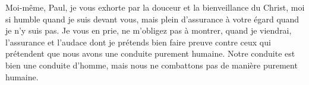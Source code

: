 Moi-même, Paul, je vous exhorte par la douceur et la bienveillance du Christ,
	moi si humble quand je suis devant vous,
	mais plein d’assurance à votre égard quand je n’y suis pas.
Je vous en prie, ne m’obligez pas à montrer, quand je viendrai,
	l’assurance et l’audace dont je prétends bien faire preuve
		contre ceux qui prétendent que nous avons une conduite purement humaine.
Notre conduite est bien une conduite d’homme,
	mais nous ne combattons pas de manière purement humaine.
